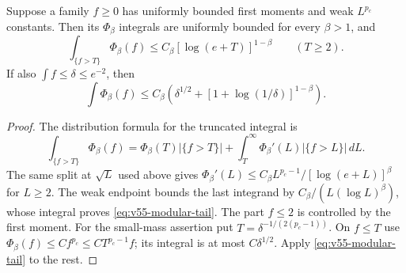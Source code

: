 \begin{lemma}
\label{lem:v55-modular}
Suppose a family $f\ge0$ has uniformly bounded first moments and
weak $L^{p_c}$ constants. Then its $\Phi_\beta$ integrals are
uniformly bounded for every $\beta>1$, and
\begin{equation}\label{eq:v55-modular-tail}
 \int_{\{f>T\}}\Phi_\beta(f)
             \le C_\beta[\log(e+T)]^{1-\beta}\qquad(T\ge2).
\end{equation}
If also $\int f\le\delta\le e^{-2}$, then
\begin{equation}\label{eq:v55-small-modular}
 \int\Phi_\beta(f)\le C_\beta\left(
  \delta^{1/2}+[1+\log(1/\delta)]^{1-\beta}\right).
\end{equation}
\end{lemma}
\begin{proof}
The distribution formula for the truncated integral is
\[
 \int_{\{f>T\}}\Phi_\beta(f)
 =\Phi_\beta(T)|\{f>T\}|+
       \int_T^\infty\Phi_\beta'(L)|\{f>L\}|\,dL.
\]
The same split at $\sqrt L$ used above gives
$\Phi_\beta'(L)\le C_\beta
 L^{p_c-1}/[\log(e+L)]^\beta$ for $L\ge2$.
The weak endpoint bounds the last integrand by
$C_\beta/(L(\log L)^\beta)$, whose integral proves
\eqref{eq:v55-modular-tail}. The part $f\le2$ is controlled by the
first moment. For the small-mass assertion put
$T=\delta^{-1/(2(p_c-1))}$. On $f\le T$ use
$\Phi_\beta(f)\le C f^{p_c}\le CT^{p_c-1}f$; its integral is at
most $C\delta^{1/2}$. Apply \eqref{eq:v55-modular-tail} to the rest.
\end{proof}

